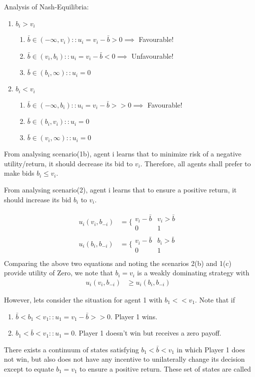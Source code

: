 \documentclass[11pt]{article}
\theoremstyle{definition}
\begin{document}
Analysis of Nash-Equilibria:
\begin{enumerate}
\item $b_i > v_i$
\begin{enumerate}
\item $\bar{b} \in (-\infty,v_i) \colon\colon u_i = v_i - \bar{b} > 0 \implies$ Favourable!
\item $\bar{b} \in (v_i,b_i) \colon \colon u_i = v_i - \bar{b} < 0 \implies$ Unfavourable! 
\item $\bar{b} \in (b_i, \infty) \colon\colon u_i = 0 $ 
\end{enumerate}
\item $b_i < v_i$
\begin{enumerate}
\item $\bar{b} \in (-\infty,b_i) \colon\colon u_i = v_i - \bar{b} >> 0 \implies $ Favourable! 
\item $\bar{b} \in (b_i,v_i) \colon \colon u_i =  0$ 
\item $\bar{b} \in (v_i, \infty) \colon\colon u_i = 0$ 
\end{enumerate}
\end{enumerate}
From analysing scenario(1b), agent i learns that to minimize risk of a negative utility/return, it should decrease its bid to $v_i$. Therefore, all agents shall prefer to make bids $b_i \leq v_i$.

From analysing scenario(2), agent i learns that to ensure a positive return, it should increase its bid $b_i$ to $v_i$.


\begin{align*}
u_i(v_i,b_{-i}) &= \bigg\{\begin{array}{cc}v_i - \bar{b} & v_i > \bar{b}\\ 0 & 1\end{array}\\
u_i(b_i,b_{-i}) &= \bigg\{\begin{array}{cc}v_i - \bar{b} & b_i > \bar{b}\\ 0 & 1\end{array}\\
\end{align*}
Comparing the above two equations and noting the scenarios 2(b) and 1(c) provide utility of Zero, we note that $b_i = v_i$ is a weakly dominating strategy with
\begin{align*}
u_i(v_i,b_{-i}) &\geq u_i(b_i,b_{-i})
\end{align*}


However, lets consider the situation for agent 1 with $b_1 < < v_1$. Note that if
\begin{enumerate}
\item $ \bar{b} < b_1 < v_1 \colon\colon u_1 = v_1 - \bar{b} >> 0$. Player 1 wins.
\item $b_1 < \bar{b} < v_1  \colon\colon u_1 = 0$. Player 1 doesn't win but receives a zero payoff.
\end{enumerate}
There exists a continuum of states satisfying $b_1 < \bar{b} < v_1$ in which Player 1 does not win, but also does not have any incentive to unilaterally change its decision except to equate $b_1 = v_1$ to ensure a positive return.
These set of states are called 
\end{document}
